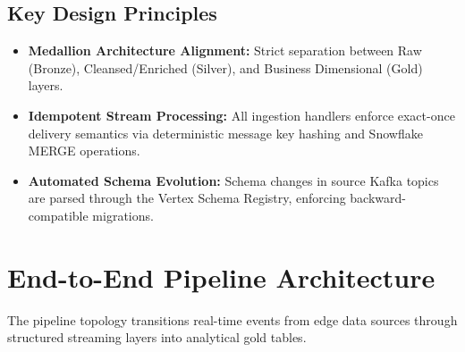 \documentclass[10pt, a4paper]{article}
\begin{document}
\par \vspace{4pt}

\subsection{Key Design Principles}
\begin{itemize}[leftmargin=1.5em, itemsep=1pt, topsep=1pt]
    \item \textbf{Medallion Architecture Alignment:} Strict separation between Raw (Bronze), Cleansed/Enriched (Silver), and Business Dimensional (Gold) layers.
    \item \textbf{Idempotent Stream Processing:} All ingestion handlers enforce exact-once delivery semantics via deterministic message key hashing and Snowflake MERGE operations.
    \item \textbf{Automated Schema Evolution:} Schema changes in source Kafka topics are parsed through the Vertex Schema Registry, enforcing backward-compatible migrations.
\end{itemize}

\section{End-to-End Pipeline Architecture}

The pipeline topology transitions real-time events from edge data sources through structured streaming layers into analytical gold tables.

\vspace{3pt}
\end{document}
